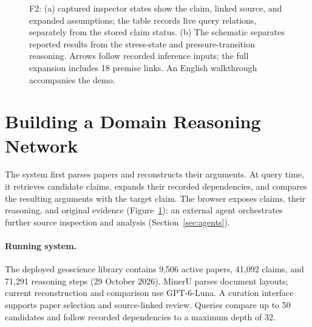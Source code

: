 \documentclass[sigconf,screen,review]{acmart}
\begin{document}
\begin{figure}[t]
\begin{minipage}[t]{0.46\textwidth}
\end{minipage}
\caption{F2: (a) captured inspector states show the claim, linked source, and expanded assumptions; the table records live query relations, separately from the stored claim status. (b) The schematic separates reported results from the stress-state and pressure-transition reasoning. Arrows follow recorded inference inputs; the full expansion includes 18 premise links. An English walkthrough accompanies the demo.}
\label{fig:architecture}
\end{figure}

\section{Building a Domain Reasoning Network}
\label{sec:network}
The system first parses papers and reconstructs their arguments. At query time, it retrieves candidate claims, expands their recorded dependencies, and compares the resulting arguments with the target claim. The browser exposes claims, their reasoning, and original evidence (Figure~\ref{fig:architecture}); an external agent orchestrates further source inspection and analysis (Section~\ref{sec:agents}).
\paragraph{Running system.}
The deployed geoscience library contains 9,506 active papers, 41,092 claims, and 71,291 reasoning steps (29 October 2026). MinerU parses document layouts; current reconstruction and comparison use GPT-6-Luna. A curation interface supports paper selection and source-linked review. Queries compare up to 50 candidates and follow recorded dependencies to a maximum depth of 32.
\end{document}
